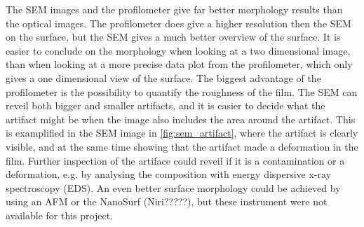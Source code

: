 The SEM images and the profilometer give far better morphology results than the optical images.
The profilometer does give a higher resolution then the SEM on the surface, but the SEM gives a much better overview of the surface.
It is easier to conclude on the morphology when looking at a two dimensional image, than when looking at a more precise data plot from the profilometer, which only gives a one dimensional view of the surface.
The biggest advantage of the profilometer is the possibility to quantify the roughness of the film.
The SEM can reveil both bigger and smaller artifacts, and it is easier to decide what the artifact might be when the image also includes the area around the artifact.
This is examplified in the SEM image in \autoref{fig:sem_artifact}, where the artifact is clearly visible, and at the same time showing that the artifact made a deformation in the film.
Further inspection of the artiface could reveil if it is a contamination or a deformation, e.g. by analysing the composition with energy dispersive x-ray spectroscopy (EDS).
An even better surface morphology could be achieved by using an AFM or the NanoSurf (Niri?????), but these instrument were not available for this project.
